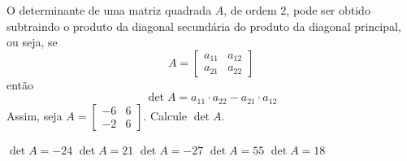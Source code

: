 O determinante de uma matriz quadrada $A$, de ordem $2$, pode ser obtido subtraindo o produto da diagonal secundária do produto da diagonal principal, ou seja, se
\[A = \left[ \begin{array}{cc}
a_{11}  &   a_{12}\\
a_{21}   & a_{22}
\end{array} \right]\]
então
\[\det A=a_{11}\cdot a_{22}-a_{21}\cdot a_{12}\]
Assim, seja $A = \left[ \begin{array}{cc}
-6  &   6\\
-2   &  6
\end{array} \right]$. Calcule $\det A$.

$\det A=-24$
$\det A=21$
$\det A=-27$
$\det A=55$
$\det A=18$


